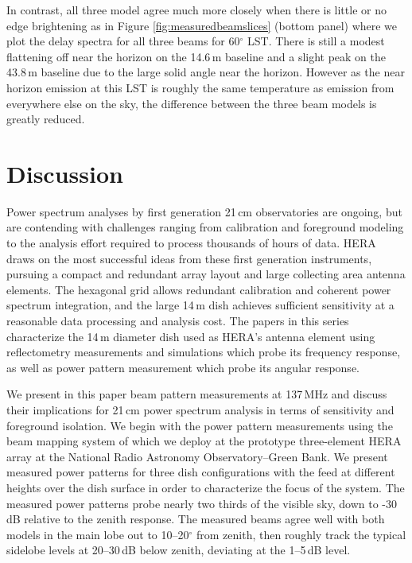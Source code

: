 \documentclass{emulateapj}
\begin{document}
In contrast, all three model agree much more closely when there is little or no edge brightening as in Figure \ref{fig:measuredbeamslices} (bottom panel) where we plot the delay spectra for all three beams for 60$^\circ$ LST. There is still a modest flattening off near the horizon on the 14.6\,m baseline and a slight peak on the 43.8\,m baseline due to the large solid angle near the horizon. However as the near horizon emission at this LST is roughly the same temperature as emission from everywhere else on the sky, the difference between the three beam models is greatly reduced.

\section{Discussion}

Power spectrum analyses by first generation 21\,cm observatories are ongoing, but are contending with challenges ranging from calibration and foreground modeling to the analysis effort required to process thousands of hours of data. HERA draws on the most successful ideas from these first generation instruments, pursuing a compact and redundant array layout and large collecting area antenna elements. The hexagonal grid allows redundant calibration and coherent power spectrum integration, and the large 14\,m dish achieves sufficient sensitivity at a reasonable data processing and analysis cost. The papers in this series characterize the 14\,m diameter dish used as HERA's antenna element using reflectometry measurements and simulations which probe its frequency response, as well as power pattern measurement which probe its angular response. 

We present in this paper beam pattern measurements at 137\,MHz and discuss their implications for 21\,cm power spectrum analysis in terms of sensitivity and foreground isolation. We begin with the power pattern measurements using the beam mapping system of \citet{neben15} which we deploy at the prototype three-element HERA array at the National Radio Astronomy Observatory--Green Bank. We present measured power patterns for three dish configurations with the feed at different heights over the dish surface in order to characterize the focus of the system. The measured power patterns probe nearly two thirds of the visible sky, down to -30\,dB relative to the zenith response. The measured beams agree well with both models in the main lobe out to 10--20$^\circ$ from zenith, then roughly track the typical sidelobe levels at 20--30\,dB below zenith, deviating at the 1--5\,dB level. 
\end{document}
